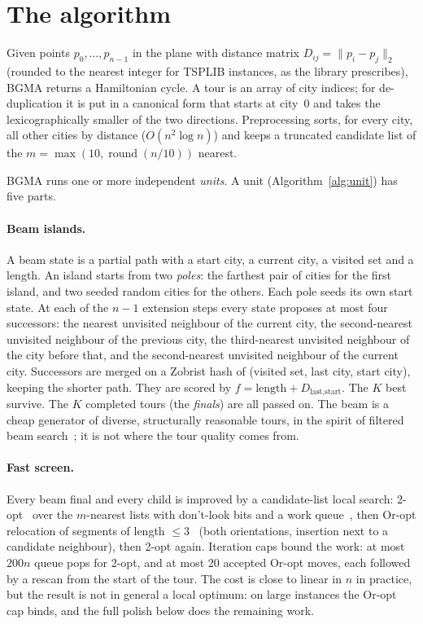 \section{The algorithm}\label{sec:method}

Given points $p_0,\dots,p_{n-1}$ in the plane with distance matrix $D_{ij}=\lVert p_i-p_j\rVert_2$
(rounded to the nearest integer for TSPLIB  instances, as the library prescribes), BGMA
returns a Hamiltonian cycle. A tour is an array of city indices; for de-duplication it is put in a
canonical form that starts at city~0 and takes the lexicographically smaller of the two directions.
Preprocessing sorts, for every city, all other cities by distance ($O(n^2\log n)$) and keeps a
truncated candidate list of the $m=\max(10,\operatorname{round}(n/10))$ nearest.

BGMA runs one or more independent \emph{units}. A unit (Algorithm~\ref{alg:unit}) has five parts.

\paragraph{Beam islands.}
A beam state is a partial path with a start city, a current city, a visited set and a length. An island
starts from two \emph{poles}: the farthest pair of cities for the first island, and two seeded random
cities for the others. Each pole seeds its own start state. At each of the $n-1$ extension steps
every state proposes at most four successors: the nearest unvisited neighbour of the current city,
the second-nearest unvisited neighbour of the previous city, the third-nearest unvisited neighbour of
the city before that, and the second-nearest unvisited neighbour of the current city. Successors
are merged on a Zobrist hash of (visited set, last city, start city), keeping the shorter path.
They are scored by $f=\text{length}+D_{\text{last},\text{start}}$. The $K$ best survive. The $K$
completed tours (the \emph{finals}) are all passed on. The beam is a cheap generator of diverse,
structurally reasonable tours, in the spirit of filtered beam search~\citep{ow1988}; it is not where
the tour quality comes from.

\paragraph{Fast screen.}
Every beam final and every child is improved by a candidate-list local search: 2-opt~\citep{croes1958}
over the $m$-nearest lists with don't-look bits and a work queue~\citep{bentley1992}, then Or-opt
relocation of segments of length $\le 3$~\citep{or1976} (both orientations, insertion next to a
candidate neighbour), then 2-opt again. Iteration caps bound the work: at most $200n$ queue pops for 2-opt, and at most 20 accepted Or-opt
moves, each followed by a rescan from the start of the tour. The cost is close to linear in $n$ in
practice, but the result is not in general a local optimum: on large instances the Or-opt cap binds,
and the full polish below does the remaining work.

